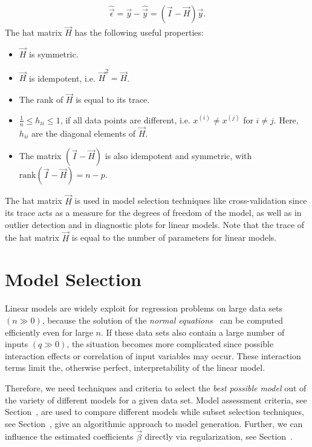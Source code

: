 \begin{align} \label{eq:residal_with_hat_matrix}
	\hat{\vec{\epsilon}} = \vec{y} - \hat{\vec{y}} = (\vec{I} - \vec{H}) \vec{y}.
\end{align}
%
The hat matrix $\vec{H}$ has the following useful properties:

\begin{itemize}
	\item $\vec{H}$ is symmetric.
	\item $\vec{H}$ is idempotent, i.e. $\vec{H}^2 = \vec{H}$.
	\item The rank of $\vec{H}$ is equal to its trace.
 	\item $\frac{1}{n} \le h_{ii} \le 1$, if all data points are different, i.e. $x^{(i)} \ne x^{(j)}$ for $i \ne j$. Here, $h_{ii}$ are the diagonal elements of $\vec{H}$.
	\item The matrix $(\vec{I} - \vec{H})$ is also idempotent and symmetric, with $\mathrm{rank}(\vec{I} - \vec{H}) = n - p$.
\end{itemize}

The hat matrix $\vec{H}$ is used in model selection techniques like cross-validation since its trace acts as a measure for the degrees of freedom of the model, as well as in outlier detection and in diagnostic plots for linear models. Note that the trace of the hat matrix $\vec{H}$ is equal to the number of parameters for linear models. 

\section{Model Selection} \label{sec:ModelSelection}

Linear models are widely exploit for regression problems on large data sets $(n \gg 0)$, because the solution of the \emph{normal equations}~ can be computed efficiently even for large $n$. If these data sets also contain a large number of inputs $(q \gg 0)$, the situation becomes more complicated since possible interaction effects or correlation of input variables may occur. These interaction terms limit the, otherwise perfect, interpretability of the linear model. 

Therefore, we need techniques and criteria to select the \emph{best possible model} out of the variety of different models for a given data set. Model assessment criteria, see Section~, are used to compare different models while subset selection techniques, see Section~, give an algorithmic approach to model generation. Further, we can influence the estimated coefficients $\vec{\beta}$ directly via regularization, see Section~. 

